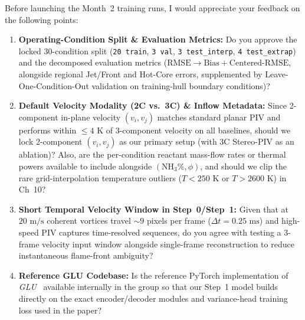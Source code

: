 \documentclass[11pt,letterpaper]{article}
\begin{document}
Before launching the Month~2 training runs, I would appreciate your feedback on the following points:
\begin{enumerate}
    \item \textbf{Operating-Condition Split \& Evaluation Metrics:} Do you approve the locked 30-condition split (\texttt{20 train}, \texttt{3 val}, \texttt{3 test\_interp}, \texttt{4 test\_extrap}) and the decomposed evaluation metrics ($\text{RMSE} \rightarrow \text{Bias} + \text{Centered-RMSE}$, alongside regional Jet/Front and Hot-Core errors, supplemented by Leave-One-Condition-Out validation on training-hull boundary conditions)?
    \item \textbf{Default Velocity Modality (2C vs.\ 3C) \& Inflow Metadata:} Since 2-component in-plane velocity $(v_i, v_j)$ matches standard planar PIV and performs within $\le 4\text{ K}$ of 3-component velocity on all baselines, should we lock 2-component $(v_i, v_j)$ as our primary setup (with 3C Stereo-PIV as an ablation)? Also, are the per-condition reactant mass-flow rates or thermal powers available to include alongside $(\text{NH}_3\%, \phi)$, and should we clip the rare grid-interpolation temperature outliers ($T < 250\text{ K}$ or $T > 2600\text{ K}$) in Ch~10?
    \item \textbf{Short Temporal Velocity Window in Step~0/Step~1:} Given that at $20\text{ m/s}$ coherent vortices travel $\sim 9$ pixels per frame ($\Delta t = 0.25\text{ ms}$) and high-speed PIV captures time-resolved sequences, do you agree with testing a 3-frame velocity input window alongside single-frame reconstruction to reduce instantaneous flame-front ambiguity?
    \item \textbf{Reference GLU Codebase:} Is the reference PyTorch implementation of \textit{GLU}~\cite{wang2026glu} available internally in the group so that our Step~1 model builds directly on the exact encoder/decoder modules and variance-head training loss used in the paper?
\end{enumerate}



\end{document}

